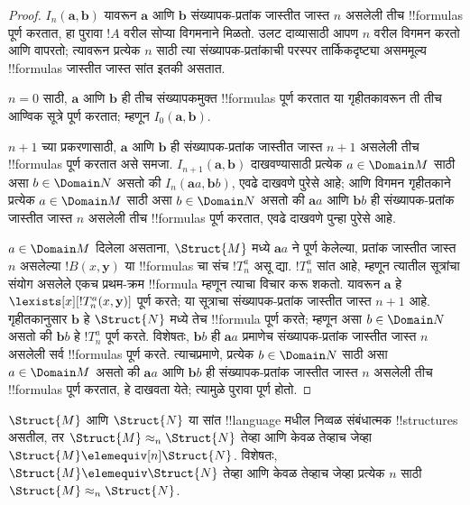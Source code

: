 \documentclass[../../../include/open-logic-section]{subfiles}
\begin{document}
\begin{proof}
  $I_n(\mathbf{a},\mathbf{b})$ यावरून $\mathbf{a}$ आणि $\mathbf{b}$
  संख्यापक-प्रतांक जास्तीत जास्त $n$ असलेली तीच !!{formula}s पूर्ण करतात,
  हा पुरावा $!A$ वरील सोप्या विगमनाने मिळतो. उलट दाव्यासाठी आपण $n$
  वरील विगमन करतो आणि  वापरतो; त्यावरून प्रत्येक
  $n$ साठी त्या संख्यापक-प्रतांकाची परस्पर तार्किकदृष्ट्या असममूल्य
  !!{formula}s जास्तीत जास्त सांत इतकी असतात.

  $n=0$ साठी, $\mathbf{a}$ आणि $\mathbf{b}$ ही तीच संख्यापकमुक्त
  !!{formula}s पूर्ण करतात या गृहीतकावरून ती तीच आण्विक सूत्रे पूर्ण करतात;
  म्हणून $I_0(\mathbf{a},\mathbf{b})$.

  $n+1$ च्या प्रकरणासाठी, $\mathbf{a}$ आणि $\mathbf{b}$ ही
  संख्यापक-प्रतांक जास्तीत जास्त $n+1$ असलेली तीच !!{formula}s पूर्ण
  करतात असे समजा. $I_{n+1}(\mathbf{a},\mathbf{b})$ दाखवण्यासाठी प्रत्येक
  $a \in \Domain M$ साठी असा $b \in \Domain N$ असतो की
  $I_n(\mathbf{a}a,\mathbf{b}b)$, एवढे दाखवणे पुरेसे आहे; आणि विगमन
  गृहीतकाने प्रत्येक $a \in \Domain M$ साठी असा $b \in \Domain N$ असतो
  की $\mathbf{a}a$ आणि $\mathbf{b}b$ ही संख्यापक-प्रतांक जास्तीत जास्त
  $n$ असलेली तीच !!{formula}s पूर्ण करतात, एवढे दाखवणे पुन्हा पुरेसे आहे.

  $a \in \Domain M$ दिलेला असताना, $\Struct{M}$ मध्ये $\mathbf{a}a$ ने
  पूर्ण केलेल्या, प्रतांक जास्तीत जास्त $n$ असलेल्या
  $!B(x,\mathbf{y})$ या !!{formula}s चा संच $!T^a_n$ असू द्या.
  $!T^a_n$ सांत आहे, म्हणून त्यातील सूत्रांचा संयोग असलेले एकच प्रथम-क्रम
  !!{formula} म्हणून त्याचा विचार करू शकतो. यावरून $\mathbf{a}$ हे
  $\lexists[x][!T^a_n(x,\mathbf{y})]$ पूर्ण करते; या सूत्राचा
  संख्यापक-प्रतांक जास्तीत जास्त $n+1$ आहे. गृहीतकानुसार $\mathbf{b}$ हे
  $\Struct{N}$ मध्ये तेच !!{formula} पूर्ण करते; म्हणून असा $b \in
  \Domain N$ असतो की $\mathbf{b}b$ हे $!T^a_n$ पूर्ण करते. विशेषतः,
  $\mathbf{b}b$ ही $\mathbf{a}a$ प्रमाणेच संख्यापक-प्रतांक जास्तीत जास्त
  $n$ असलेली सर्व !!{formula}s पूर्ण करते. त्याचप्रमाणे, प्रत्येक $b \in
  \Domain N$ साठी असा $a\in \Domain M$ असतो की $\mathbf{a}a$ आणि
  $\mathbf{b}b$ ही संख्यापक-प्रतांक जास्तीत जास्त $n$ असलेली तीच
  !!{formula}s पूर्ण करतात, हे दाखवता येते; त्यामुळे पुरावा पूर्ण होतो.
\end{proof}

\begin{cor}
  $\Struct{M}$ आणि $\Struct{N}$ या सांत !!{language} मधील निव्वळ
  संबंधात्मक !!{structure}s असतील, तर $\Struct{M} \approx_n\Struct{N}$
  तेव्हा आणि केवळ तेव्हाच जेव्हा $\Struct{M} \elemequiv[n] \Struct{N}$.
  विशेषतः, $\Struct{M} \elemequiv \Struct{N}$ तेव्हा आणि केवळ तेव्हाच
  जेव्हा प्रत्येक $n$ साठी $\Struct{M} \approx_n \Struct{N}$.
\end{cor}
\end{document}
